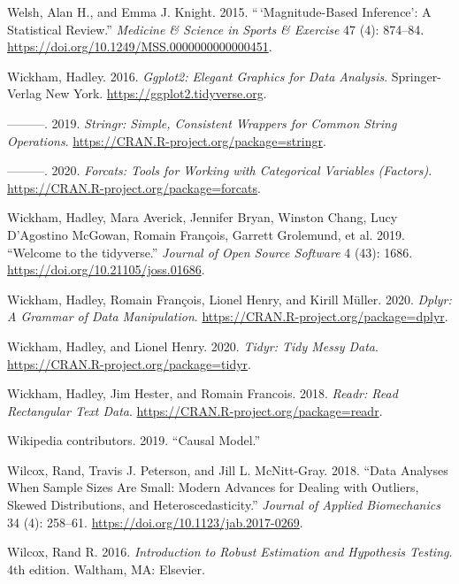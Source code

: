 \documentclass[
]{book}
\newlength{\cslhangindent}
\newenvironment{cslreferences}%
  {\setlength{\parindent}{0pt}%
  \everypar{\setlength{\hangindent}{\cslhangindent}}\ignorespaces}%
  {\par}
\begin{document}
\begin{cslreferences}
\leavevmode\hypertarget{ref-welshMagnitudebasedInferenceStatistical2015}{}%
Welsh, Alan H., and Emma J. Knight. 2015. ``\,`Magnitude-Based Inference': A Statistical Review.'' \emph{Medicine \& Science in Sports \& Exercise} 47 (4): 874--84. \url{https://doi.org/10.1249/MSS.0000000000000451}.

\leavevmode\hypertarget{ref-R-ggplot2}{}%
Wickham, Hadley. 2016. \emph{Ggplot2: Elegant Graphics for Data Analysis}. Springer-Verlag New York. \url{https://ggplot2.tidyverse.org}.

\leavevmode\hypertarget{ref-R-stringr}{}%
---------. 2019. \emph{Stringr: Simple, Consistent Wrappers for Common String Operations}. \url{https://CRAN.R-project.org/package=stringr}.

\leavevmode\hypertarget{ref-R-forcats}{}%
---------. 2020. \emph{Forcats: Tools for Working with Categorical Variables (Factors)}. \url{https://CRAN.R-project.org/package=forcats}.

\leavevmode\hypertarget{ref-R-tidyverse}{}%
Wickham, Hadley, Mara Averick, Jennifer Bryan, Winston Chang, Lucy D'Agostino McGowan, Romain François, Garrett Grolemund, et al. 2019. ``Welcome to the tidyverse.'' \emph{Journal of Open Source Software} 4 (43): 1686. \url{https://doi.org/10.21105/joss.01686}.

\leavevmode\hypertarget{ref-R-dplyr}{}%
Wickham, Hadley, Romain François, Lionel Henry, and Kirill Müller. 2020. \emph{Dplyr: A Grammar of Data Manipulation}. \url{https://CRAN.R-project.org/package=dplyr}.

\leavevmode\hypertarget{ref-R-tidyr}{}%
Wickham, Hadley, and Lionel Henry. 2020. \emph{Tidyr: Tidy Messy Data}. \url{https://CRAN.R-project.org/package=tidyr}.

\leavevmode\hypertarget{ref-R-readr}{}%
Wickham, Hadley, Jim Hester, and Romain Francois. 2018. \emph{Readr: Read Rectangular Text Data}. \url{https://CRAN.R-project.org/package=readr}.

\leavevmode\hypertarget{ref-wiki:xxx}{}%
Wikipedia contributors. 2019. ``Causal Model.''

\leavevmode\hypertarget{ref-wilcoxDataAnalysesWhen2018}{}%
Wilcox, Rand, Travis J. Peterson, and Jill L. McNitt-Gray. 2018. ``Data Analyses When Sample Sizes Are Small: Modern Advances for Dealing with Outliers, Skewed Distributions, and Heteroscedasticity.'' \emph{Journal of Applied Biomechanics} 34 (4): 258--61. \url{https://doi.org/10.1123/jab.2017-0269}.

\leavevmode\hypertarget{ref-wilcoxIntroductionRobustEstimation2016}{}%
Wilcox, Rand R. 2016. \emph{Introduction to Robust Estimation and Hypothesis Testing}. 4th edition. Waltham, MA: Elsevier.


\end{cslreferences}
\end{document}
